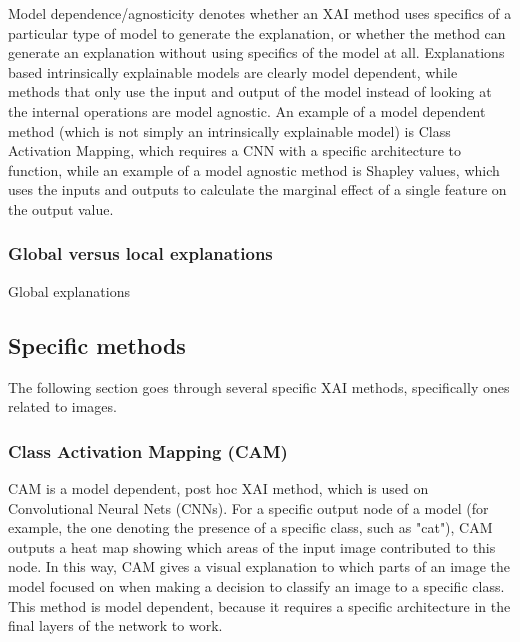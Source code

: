 \documentclass[conference]{IEEEtran}
\begin{document}
Model dependence/agnosticity denotes whether an XAI method uses specifics of a particular type of model to generate the explanation, or whether the method can generate an explanation without using specifics of the model at all. Explanations based intrinsically explainable models are clearly model dependent, while methods that only use the input and output of the model instead of looking at the internal operations are model agnostic. An example of a model dependent method (which is not simply an intrinsically explainable model) is Class Activation Mapping, which requires a CNN with a specific architecture to function, while an example of a model agnostic method is Shapley values, which uses the inputs and outputs to calculate the marginal effect of a single feature on the output value.

\subsubsection{Global versus local explanations}

Global explanations

\subsection{Specific methods}

The following section goes through several specific XAI methods, specifically ones related to images.

\subsubsection{Class Activation Mapping (CAM)}

CAM \cite{cam} is a model dependent, post hoc XAI method, which is used on Convolutional Neural Nets (CNNs). For a specific output node of a model (for example, the one denoting the presence of a specific class, such as "cat"), CAM outputs a heat map showing which areas of the input image contributed to this node. In this way, CAM gives a visual explanation to which parts of an image the model focused on when making a decision to classify an image to a specific class. This method is model dependent, because it requires a specific architecture in the final layers of the network to work.
\end{document}
